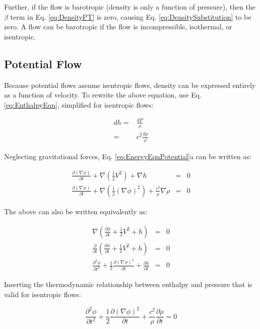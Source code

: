 \documentclass[10pt]{article}
\newcommand{\beq}{\begin{equation}}
\newcommand{\eeq}{\end{equation}}
\newcommand{\beqa}{\begin{equation}\begin{aligned}}
\newcommand{\eeqa}{\end{aligned}\end{equation}}
\begin{document}
\begin{flushleft}
Further, if the flow is barotropic (density is only a function of pressure), then the \(\beta\) term in Eq. \eqref{eq:DensityPT} is zero, causing Eq. \eqref{eq:DensitySubstitution} to be zero. A flow can be barotropic if the flow is incompressible, isothermal, or isentropic. 

\subsection{Potential Flow}
Because potential flows assume isentropic flows, density can be expressed entirely as a function of velocity. To rewrite the above equation, use Eq. \eqref{eq:EnthalpyEqn}, simplified for isentropic flows:

\beqa
dh=&\frac{dP}{\rho}\\
=&c^2\frac{d\rho}{\rho}
\eeqa

Neglecting gravitational forces, Eq. \eqref{eq:EnergyEqnPotential}a can be written as:

\begin{subequations}
\label{eq:R1}
\begin{eqnarray}
\frac{\partial (\nabla\phi)}{\partial t}+\nabla \left(\frac{1}{2}V^2\right)+\nabla h&=&0\\
\frac{\partial (\nabla\phi)}{\partial t}+\nabla \left(\frac{1}{2}(\nabla\phi)^2\right)+\frac{c^2}{\rho}\nabla\rho&=&0
\end{eqnarray}
\end{subequations}

The above can also be written equivalently as:

\begin{subequations}
\begin{eqnarray}
\nabla\left(\frac{\partial\phi}{\partial t}+\frac{1}{2}V^2+h\right)&=&0\\
\frac{\partial}{\partial t}\left(\frac{\partial\phi}{\partial t}+\frac{1}{2}V^2+h\right)&=&0\\
\frac{\partial^2\phi}{\partial t^2}+\frac{1}{2}\frac{\partial (\nabla\phi)^2}{\partial t}+\frac{\partial h}{\partial t}&=&0
\end{eqnarray}
\end{subequations}

Inserting the thermodynamic relationship between enthalpy and pressure that is valid for isentropic flows:

\beq
\label{eq:R2}
\frac{\partial^2\phi}{\partial t^2}+\frac{1}{2}\frac{\partial (\nabla\phi)^2}{\partial t}+\frac{c^2}{\rho}\frac{\partial\rho}{\partial t}=0
\eeq


\end{flushleft}
\end{document}
